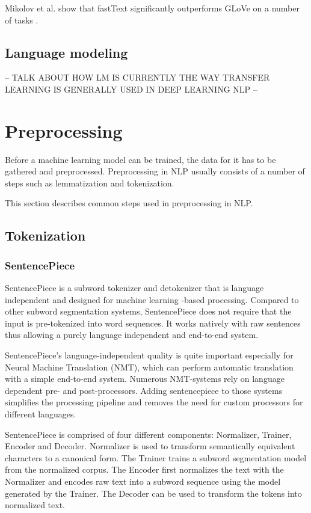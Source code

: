 Mikolov et al. show that fastText significantly outperforms GLoVe on a number of tasks \cite{mikolov2017}.

\subsection{Language modeling}\label{Language modeling}
-- TALK ABOUT HOW LM IS CURRENTLY THE WAY TRANSFER LEARNING IS GENERALLY USED IN DEEP LEARNING NLP --


\section{Preprocessing} \label{Preprocessing}
Before a machine learning model can be trained, the data for it has to be gathered and preprocessed.
Preprocessing in NLP usually consists of a number of steps such as lemmatization and tokenization.

This section describes common steps used in preprocessing in NLP.

\subsection{Tokenization} \label{Tokenization}
\cite{webster1992}
\subsubsection{SentencePiece} \label{SentencePiece}

SentencePiece is a subword tokenizer and detokenizer that is language independent and designed for machine learning -based processing. \cite{kudo2018}
Compared to other subword segmentation systems, SentencePiece does not require that the input is pre-tokenized into word sequences. It works natively with raw sentences thus allowing a purely language independent and end-to-end system.

SentencePiece's language-independent quality is quite important especially for Neural Machine Translation (NMT), which can perform automatic translation with a simple end-to-end system. Numerous NMT-systems rely on language dependent pre- and post-processors. Adding sentencepiece to those systems simplifies the processing pipeline and removes the need for custom processors for different languages.

SentencePiece is comprised of four different components: Normalizer, Trainer, Encoder and Decoder. \cite{kudo2018} Normalizer is used to transform semantically equivalent characters to a canonical form. The Trainer trains a subword segmentation model from the normalized corpus. The Encoder first normalizes the text with the Normalizer and encodes raw text into a subword sequence using the model generated by the Trainer. The Decoder can be used to transform the tokens into normalized text. \cite{kudo2018}


